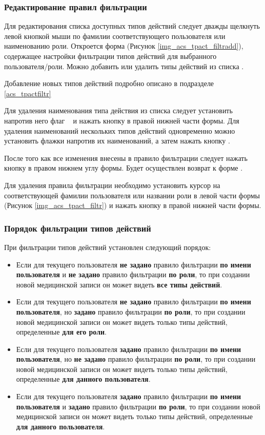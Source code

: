 \subsubsection{Редактирование правил фильтрации}

Для редактирования списка доступных типов действий следует дважды щелкнуть левой кнопкой мыши по фамилии соответствующего пользователя или наименованию роли. Откроется форма  (Рисунок \ref{img_acs_tpact_filtradd}), содержащее настройки фильтрации типов действий для выбранного пользователя/роли. Можно добавить или удалить типы действий из списка .

Добавление новых типов действий подробно описано в подразделе \ref{acs_tpactfiltr}

Для удаления наименования типа действия из списка следует установить напротив него флаг  \putx~ и нажать кнопку   в правой нижней части формы. Для удаления наименований нескольких типов действий одновременно можно установить флажки   напротив их наименований, а затем нажать кнопку .

После того как все изменения внесены в правило фильтрации следует нажать кнопку   в правом нижнем углу формы. Будет осуществлен возврат к форме .

Для удаления правила фильтрации необходимо установить курсор на соответствующей фамилии пользователя или названии роли в левой части формы (Рисунок \ref{img_acs_tpact_filtr}) и нажать кнопку   в правой нижней части формы.

\subsubsection{Порядок фильтрации типов действий}

При фильтрации типов действий установлен следующий порядок:
\begin{itemize}
 \item Если для текущего пользователя \textbf{не задано} правило фильтрации \textbf{по имени пользователя} и \textbf{не задано} правило фильтрации \textbf{по роли}, то при создании новой медицинской записи он может видеть \textbf{все типы действий}.
 \item Если для текущего пользователя \textbf{не задано} правило фильтрации \textbf{по имени пользователя}, но \textbf{задано} правило фильтрации \textbf{по роли}, то при создании новой медицинской записи он может видеть только  типы действий, определенные \textbf{для его роли}.
 \item Если для текущего пользователя \textbf{задано} правило фильтрации \textbf{по имени пользователя}, но \textbf{не задано} правило фильтрации \textbf{по роли}, то при создании новой медицинской записи он может видеть только типы действий, определенные \textbf{для данного пользователя}.
 \item Если для текущего пользователя \textbf{задано} правило фильтрации \textbf{по имени пользователя} и \textbf{задано} правило фильтрации \textbf{по роли}, то при создании новой медицинской записи он может видеть только типы действий, определенные \textbf{для данного пользователя}.
\end{itemize}
 
